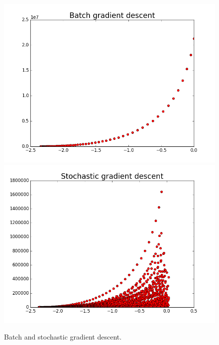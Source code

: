 \documentclass{article}
\begin{document}
\begin{figure}[width=\linewidth]
\centering
\begin{multicols}{2}
  \includegraphics[width=1.2\linewidth]{code/P1/batch_gradient_descent.png}
  \includegraphics[width=1.2\linewidth]{code/P1/sgd.png}
\end{multicols}
\caption{Batch and stochastic gradient descent.}
\end{figure}
\end{document}
